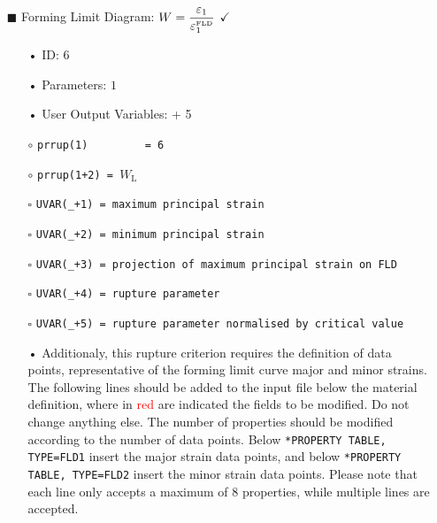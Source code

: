 \documentclass[11pt,a4paper,twoside,final,onecolumn,titlepage]{article}
\newcommand{\verified}{\hspace{0.5pt} {\LARGE $\checkmark$}}
\begin{document}
\pagebreak
\begin{itemize}
	\item[\tiny$\blacksquare$] Forming Limit Diagram: $\displaystyle W = \frac{\varepsilon_1}{\varepsilon_1^\textrm{\tiny FLD}}$ \verified{}
	\begin{itemize}
		\item[•] ID: $6$
		\item[•] Parameters: $1$
		\item[•] User Output Variables: + 5\\
		\item[$\circ$] \texttt{prrup(1)\,\,\,\,\,\,\,\,\,= 6}
		\item[$\circ$] \texttt{prrup(1+2) = $W_\textrm{L}$}\\
		\item[\tiny$\square$] \texttt{UVAR(\_+1) = maximum principal strain}
		\item[\tiny$\square$] \texttt{UVAR(\_+2) = minimum principal strain}
		\item[\tiny$\square$] \texttt{UVAR(\_+3) = projection of maximum principal strain on FLD} 
		\item[\tiny$\square$] \texttt{UVAR(\_+4) = rupture parameter}
		\item[\tiny$\square$] \texttt{UVAR(\_+5) = rupture parameter normalised by critical value}\\
		\item[•] Additionaly, this rupture criterion requires the definition of data points, representative of the forming limit curve major and minor strains. The following lines should be added to the input file below the material definition, where in \textcolor{red}{red} are indicated the fields to be modified. Do not change anything else. The number of properties should be modified according to the number of data points. Below \texttt{*PROPERTY TABLE, TYPE=FLD1} insert the major strain data points, and below \texttt{*PROPERTY TABLE, TYPE=FLD2} insert the minor strain data points. Please note that each line only accepts a maximum of 8 properties, while multiple lines are accepted.
		\par\bigskip
		\texttt{}
		\par\bigskip
	\end{itemize}
\end{itemize}
\end{document}

